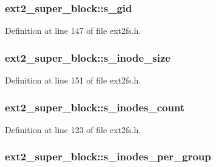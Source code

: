 \hypertarget{structext2__super__block_a84a06961e920689385e1fda033063d72}{
\subsubsection[{s\-\_\-gid}]{ {\bf ext2\-\_\-super\-\_\-block\-::s\-\_\-gid}}}\label{structext2__super__block_a84a06961e920689385e1fda033063d72}


\-Definition at line 147 of file ext2fs.\-h.

\hypertarget{structext2__super__block_a9a1ee9cd5f706fa2e753a4c781ebae73}{
\subsubsection[{s\-\_\-inode\-\_\-size}]{ {\bf ext2\-\_\-super\-\_\-block\-::s\-\_\-inode\-\_\-size}}}\label{structext2__super__block_a9a1ee9cd5f706fa2e753a4c781ebae73}


\-Definition at line 151 of file ext2fs.\-h.

\hypertarget{structext2__super__block_a2ea20f821c0ddc19b0adc7d1b8d0685d}{
\subsubsection[{s\-\_\-inodes\-\_\-count}]{ {\bf ext2\-\_\-super\-\_\-block\-::s\-\_\-inodes\-\_\-count}}}\label{structext2__super__block_a2ea20f821c0ddc19b0adc7d1b8d0685d}


\-Definition at line 123 of file ext2fs.\-h.

\hypertarget{structext2__super__block_a4b417c308a43cfd8d744c3fdd19832af}{
\subsubsection[{s\-\_\-inodes\-\_\-per\-\_\-group}]{ {\bf ext2\-\_\-super\-\_\-block\-::s\-\_\-inodes\-\_\-per\-\_\-group}}}\label{structext2__super__block_a4b417c308a43cfd8d744c3fdd19832af}


